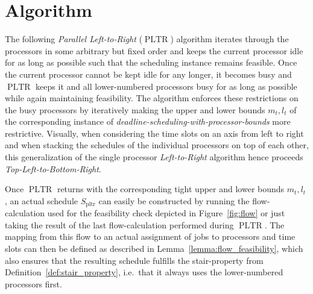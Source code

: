 \documentclass[a4paper]{article}
\DeclareMathOperator{\pltr}{pltr}
\DeclareMathOperator{\PLTR}{PLTR}
\begin{document}
\section{Algorithm}\label{section:algorithm}

The following \emph{Parallel Left-to-Right} ($\PLTR$) algorithm iterates through the processors in some arbitrary but fixed order and keeps the current processor idle for as long as possible such that the scheduling instance remains feasible.
Once the current processor cannot be kept idle for any longer, it becomes busy and $\PLTR$ keeps it and all lower-numbered processors busy for as long as possible while again maintaining feasibility.
The algorithm enforces these restrictions on the busy processors by iteratively making the upper and lower bounds $m_t, l_t$ of the corresponding instance of \emph{deadline-scheduling-with-processor-bounds} more restrictive.
Visually, when considering the time slots on an axis from left to right and when stacking the schedules of the individual processors on top of each other, this generalization of the single processor \emph{Left-to-Right} algorithm hence proceeds \emph{Top-Left-to-Bottom-Right}.

Once $\PLTR$ returns with the corresponding tight upper and lower bounds $m_t, l_t$ , an actual schedule $S_{\pltr}$ can easily be constructed by running the flow-calculation used for the feasibility check depicted in Figure~\ref{fig:flow} or just taking the result of the last flow-calculation performed during $\PLTR$.
The mapping from this flow to an actual assignment of jobs to processors and time slots can then be defined as described in Lemma~\ref{lemma:flow_feasibility}, which also ensures that the resulting schedule fulfills the stair-property from Definition~\ref{def:stair_property}, i.e.\ that it always uses the lower-numbered processors first.
\end{document}
